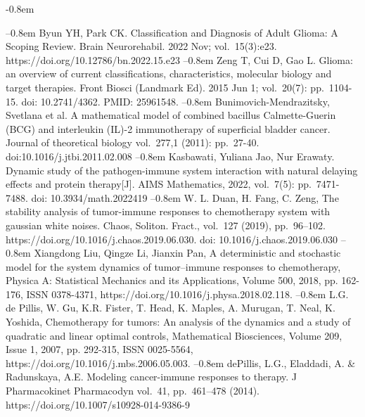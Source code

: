 \documentclass[14pt,a4paper]{extarticle}
\begin{document}
	\def\bibindent{-0.8em}
	\begin{thebibliography}{\kern\bibindent} \makeatletter \let\old@biblabel\@biblabel \def\@biblabel#1{\hspace{12.5 mm}\old@biblabel{#1}\kern\bibindent} \let\old@bibitem\bibitem \def\bibitem#1{\old@bibitem{#1}\leavevmode\kern-\bibindent} \makeatother
		
		Byun YH, Park CK. Classification and Diagnosis of Adult Glioma: A Scoping Review. Brain Neurorehabil. 2022 Nov; vol.~15(3):e23. https://doi.org/10.12786/bn.2022.15.e23
		Zeng T, Cui D, Gao L. Glioma: an overview of current classifications, characteristics, molecular biology and target therapies. Front Biosci (Landmark Ed). 2015 Jun 1; vol.~20(7): pp.~1104-15. doi: 10.2741/4362. PMID: 25961548.
		Bunimovich-Mendrazitsky, Svetlana et al. A mathematical model of combined bacillus Calmette-Guerin (BCG) and interleukin (IL)-2 immunotherapy of superficial bladder cancer. Journal of theoretical biology vol.~277,1 (2011): pp.~27-40. doi:10.1016/j.jtbi.2011.02.008
		Kasbawati, Yuliana Jao, Nur Erawaty. Dynamic study of the pathogen-immune system interaction with natural delaying effects and protein therapy[J]. AIMS Mathematics, 2022, vol.~7(5): pp.~7471-7488. doi: 10.3934/math.2022419
		W. L. Duan, H. Fang, C. Zeng, The stability analysis of tumor-immune responses to chemotherapy system with gaussian white noises. Chaos, Soliton. Fract., vol.~127 (2019), pp.~96–102. https://doi.org/10.1016/j.chaos.2019.06.030. doi: 10.1016/j.chaos.2019.06.030 
		Xiangdong Liu, Qingze Li, Jianxin Pan, A deterministic and stochastic model for the system dynamics of tumor–immune responses to chemotherapy, Physica A: Statistical Mechanics and its Applications, Volume 500, 2018, pp. 162-176, ISSN 0378-4371, https://doi.org/10.1016/j.physa.2018.02.118.
		L.G. de Pillis, W. Gu, K.R. Fister, T. Head, K. Maples, A. Murugan, T. Neal, K. Yoshida, Chemotherapy for tumors: An analysis of the dynamics and a study of quadratic and linear optimal controls, Mathematical Biosciences, Volume 209, Issue 1, 2007, pp. 292-315, ISSN 0025-5564, https://doi.org/10.1016/j.mbs.2006.05.003.
		dePillis, L.G., Eladdadi, A. \& Radunskaya, A.E. Modeling cancer-immune responses to therapy. J Pharmacokinet Pharmacodyn vol.~41, pp.~461–478 (2014). https://doi.org/10.1007/s10928-014-9386-9

\end{thebibliography}
\end{document}
